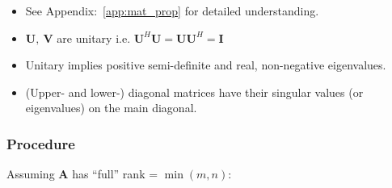
\begin{itemize}
    \item See Appendix:~\ref{app:mat_prop} for detailed understanding.
    \item $\mathbf{U},\:\mathbf{V}$ are unitary i.e. $\mathbf{U}^H \mathbf{U}=\mathbf{U}\mathbf{U}^H=\mathbf{I}$
    \item Unitary implies positive semi-definite and real, non-negative eigenvalues.
    \item (Upper- and lower-) diagonal matrices have their singular values (or eigenvalues) on the main diagonal.
\end{itemize}

\subsubsection{Procedure}
Assuming $\mathbf{A}$ has ``full'' rank = $\min(m,n)$:
